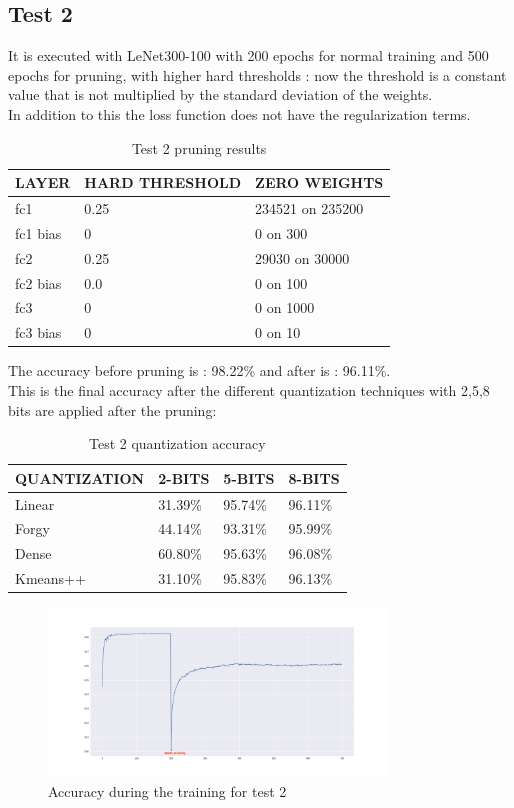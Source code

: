 \documentclass[journal]{vgtc}                %
\begin{document}
\subsection{Test 2}
It is executed with LeNet300-100 with 200 epochs for normal training and 500 epochs for pruning, with higher hard thresholds : now the threshold is a constant value that is not multiplied by the standard deviation of the weights.\\In addition to this the loss function does not have the regularization terms.
\begin{table}[H]
\caption{Test 2 pruning results}
\label{my-label}
\begin{tabular}{|l|l|l|}
\hline
LAYER    & HARD THRESHOLD & ZERO WEIGHTS     \\ \hline
fc1      & 0.25         & 234521 on 235200 \\ \hline
fc1 bias & 0     & 0 on 300        \\ \hline
fc2      & 0.25          & 29030 on 30000   \\ \hline
fc2 bias & 0.0      & 0 on 100       \\ \hline
fc3      & 0       & 0 on 1000      \\ \hline
fc3 bias & 0         & 0 on 10          \\ \hline
\end{tabular}
\end{table}
The accuracy before pruning is : 98.22\% and after is : 96.11\%.\\This is the final accuracy after the different quantization techniques with 2,5,8 bits are applied after the pruning:
\begin{table}[H]
\caption{Test 2 quantization accuracy}
\label{my-label}
\begin{tabular}{|l|l|l|l|}
\hline
QUANTIZATION & 2-BITS  & 5-BITS  & 8-BITS  \\ \hline
Linear       & 31.39\% & 95.74\% & 96.11\% \\ \hline
Forgy        & 44.14\% & 93.31\% & 95.99\% \\ \hline
Dense        & 60.80\% & 95.63\% & 96.08\% \\ \hline
Kmeans++     & 31.10\% & 95.83\% & 96.13\% \\ \hline
\end{tabular}
\end{table}\begin{figure}[H]
	\hspace*{-1cm}
	\includegraphics[width=90mm,scale=0.7]{accuracy-hard-threshold}
	\caption{Accuracy during the training for test 2}
\end{figure}
\end{document}
